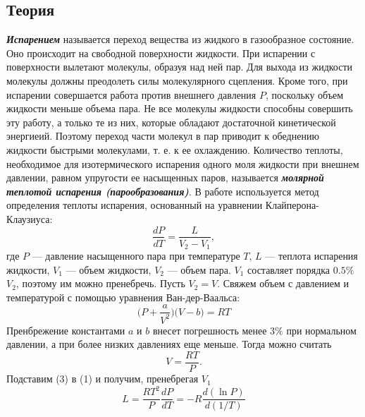 \documentclass[12pt]{article}
\begin{document}
\subsection{Теория}
\textit{\textbf{Испарением}} называется переход вещества из жидкого в газообразное состояние. Оно происходит на свободной поверхности жидкости. При испарении с поверхности вылетают молекулы, образуя над ней пар. Для выхода из жидкости молекулы должны преодолеть силы молекулярного сцепления. Кроме того, при испарении совершается работа против внешнего давления $P$, поскольку объем жидкости меньше объема пара. Не все молекулы жидкости способны совершить эту работу, а только те из них, которые обладают достаточной кинетической энергиеий. Поэтому переход части молекул в пар приводит к обеднению жидкости быстрыми молекулами, т. е. к ее охлаждению.\newline\newline
Количество теплоты, необходимое для изотермического испарения одного моля жидкости при внешнем давлении, равном упругости ее насыщенных паров, называется \textbf{\textit{молярной теплотой испарения (парообразования)}}. В работе используется метод определения теплоты испарения, основанный на уравнении Клайперона-Клаузиуса:
\begin{equation}
\frac{dP}{dT}=\frac{L}{V_2-V_1},
\end{equation}
где $P$ — давление насыщенного пара при температуре $T$, $L$ — теплота испарения жидкости, $V_1$ — объем жидкости, $V_2$ — объем пара. $V_1$ составляет порядка $0.5\%$ $V_2$, поэтому им можно пренебречь. Пусть $V_2 = V$. Свяжем объем с давлением и температурой с помощью уравнения Ван-дер-Ваальса:
\begin{equation}
\Big(P+\frac{a}{V^2}\Big)\Big(V-b\Big)=RT
\end{equation}
Пренбрежение константами $a$ и $b$ внесет погрешность менее $3\%$ при нормальном давлении, а при более низких давлениях еще меньше. Тогда можно считать
\begin{equation}
V = \frac{RT}{P}.
\end{equation}
Подставим (3) в (1) и получим, пренебрегая $V_1$
\begin{equation}
L = \frac{RT^2}{P}\frac{dP}{dT} = -R\frac{d(\ln P)}{d(1/T)}
\end{equation}
\end{document}
